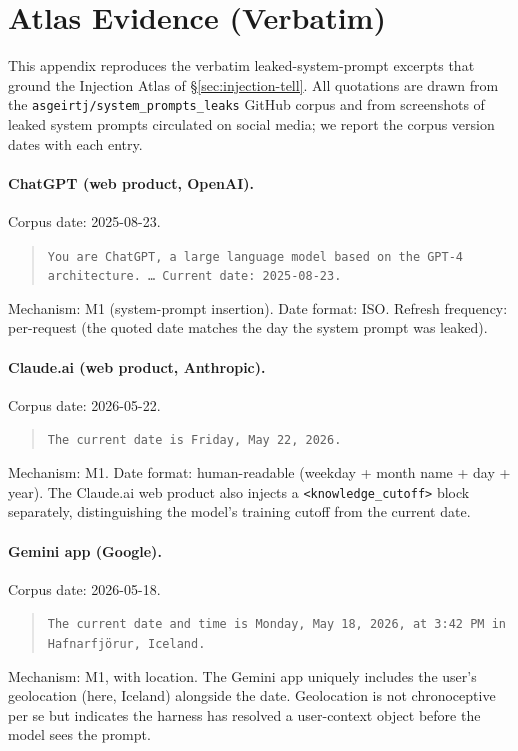 
\section{Atlas Evidence (Verbatim)}
\label{app:atlas-evidence}

This appendix reproduces the verbatim leaked-system-prompt excerpts that ground the Injection Atlas of \S\ref{sec:injection-tell}. All quotations are drawn from the \texttt{asgeirtj/system\_prompts\_leaks} GitHub corpus and from screenshots of leaked system prompts circulated on social media; we report the corpus version dates with each entry.

\paragraph{ChatGPT (web product, OpenAI).}
Corpus date: 2025-08-23.
\begin{quote}
\texttt{You are ChatGPT, a large language model based on the GPT-4 architecture. \ldots\ Current date: 2025-08-23.}
\end{quote}
Mechanism: M1 (system-prompt insertion). Date format: ISO. Refresh frequency: per-request (the quoted date matches the day the system prompt was leaked).

\paragraph{Claude.ai (web product, Anthropic).}
Corpus date: 2026-05-22.
\begin{quote}
\texttt{The current date is Friday, May 22, 2026.}
\end{quote}
Mechanism: M1. Date format: human-readable (weekday + month name + day + year). The Claude.ai web product also injects a \texttt{<knowledge\_cutoff>} block separately, distinguishing the model's training cutoff from the current date.

\paragraph{Gemini app (Google).}
Corpus date: 2026-05-18.
\begin{quote}
\texttt{The current date and time is Monday, May 18, 2026, at 3:42 PM in Hafnarfj\"or\dh ur, Iceland.}
\end{quote}
Mechanism: M1, with location. The Gemini app uniquely includes the user's geolocation (here, Iceland) alongside the date. Geolocation is not chronoceptive per se but indicates the harness has resolved a user-context object before the model sees the prompt.


